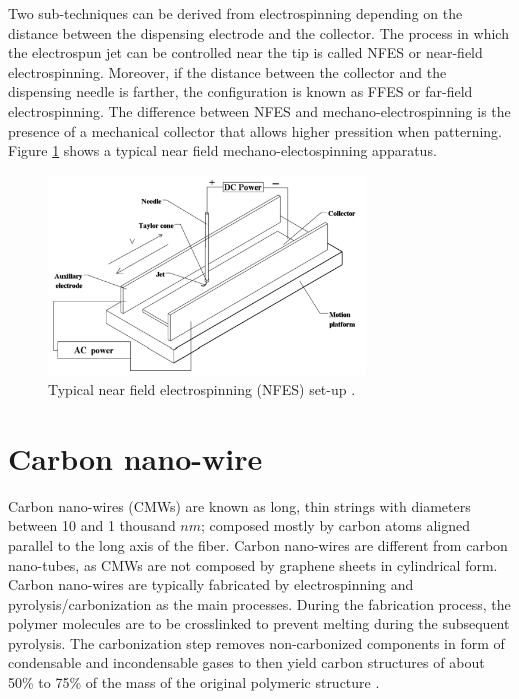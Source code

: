 Two sub-techniques can be derived from electrospinning depending on the distance between the dispensing electrode and the collector. The process in which the electrospun jet can be controlled near the tip is called NFES or near-field electrospinning. \cite{Cisquella-Serra2019} Moreover, if the distance between the collector and the dispensing needle is farther, the configuration is known as FFES or far-field electrospinning. \cite{Nataraj2012} The difference between NFES and mechano-electrospinning is the presence of a mechanical collector that allows higher pressition when patterning. Figure \ref{fig:NFES} shows a typical near field mechano-electospinning apparatus.

\begin{figure}[th]
\centering
\includegraphics[width=0.75\textwidth]{./Figures/NFES.png}
\decoRule
\caption[Near Field Electrospinning set-up]{Typical near field electrospinning (NFES) set-up \cite{Zhu2016}.}
\label{fig:NFES}
\end{figure}

%

\section{Carbon nano-wire}
Carbon nano-wires (CMWs) are known as long, thin strings with diameters between 10 and 1 thousand $n m$; composed mostly by carbon atoms aligned parallel to the long axis of the fiber. \cite{Nataraj2012} Carbon nano-wires are different from carbon nano-tubes, as CMWs are not composed by graphene sheets in cylindrical form. \cite{Nataraj2012} Carbon nano-wires are typically fabricated by electrospinning and pyrolysis/carbonization as the main processes. During the fabrication process, the polymer molecules are to be crosslinked to prevent melting during the subsequent pyrolysis. The carbonization step removes non-carbonized components in form of condensable and incondensable gases \cite{Basu2018} to then yield carbon structures of about 50\% to 75\% of the mass of the original polymeric structure \cite{Nataraj2012}.






